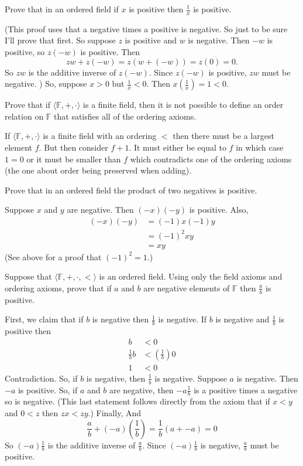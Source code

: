 \documentclass[answers]{exam}
\begin{document}
\begin{questions}
  \question Prove that in an ordered field if $x$ is positive then $\frac{1}{x}$ is positive.
  \begin{solution}
    (This proof uses that a negative times a positive is negative.  So just to be sure I'll prove that first. So 
    suppose $z$ is positive and $w$ is negative.  Then $-w$ is positive, so $z(-w)$ is positive.  Then
    \[ zw + z(-w) = z(w+(-w)) = z(0) = 0. \]
    So $zw$ is the additive inverse of $z(-w)$.  Since $z(-w)$ is positive, $zw$ must be negative. )
    So, suppose $x >0$ but $\frac{1}{x} < 0$.  Then $x\left(\frac{1}{x}\right) = 1 < 0$.
  \end{solution}

  \question Prove that if $\langle \mathbb{F},+,\cdot\rangle$ is a finite field, then it is not possible to define an order relation
  on $\mathbb{F}$ that satisfies all of the ordering axioms.
  \begin{solution}
   If $\langle \mathbb{F},+,\cdot\rangle$ is a finite field with an ordering $<$ then there must be a largest element $f$. But
   then consider $f+1$. It must either be equal to $f$ in which case $1 =0$ or it must be smaller than $f$ which contradicts one
   of the ordering axioms (the one about order being preserved when adding).
  \end{solution}

  \question Prove that in an ordered field the product of two negatives is positive.
  \begin{solution}
    Suppose $x$ and $y$ are negative.  Then $(-x)(-y)$ is positive.  Also,
    \begin{align*}
      (-x)(-y) &= (-1)x(-1)y \\
      &= (-1)^2xy\\
      &= xy
    \end{align*}
    (See above for a proof that $(-1)^2 = 1$.)
  \end{solution}


\question Suppose that $\langle \mathbb{F}, +, \cdot, < \rangle$ is an 
ordered field.  Using only the field axioms and ordering axioms, prove that 
if $a$ and $b$ are negative elements of $\mathbb{F}$ then $\frac{a}{b}$ 
is positive.
\begin{solution}
  First, we claim that if $b$ is negative then $\frac{1}{b}$ is negative. If $b$ is
  negative and $\frac{1}{b}$ is positive then
  \begin{align*}
    b &< 0 \\
    \frac{1}{b}b &< \left(\frac{1}{b}\right)0\\
    1 &< 0
  \end{align*}
  Contradiction. So, if $b$ is negative, then $\frac{1}{b}$ is negative. Suppose $a$ is 
  negative.  Then $-a$ is positive. So, if $a$ and $b$ are negative, then
  $-a\frac{1}{b}$ is a positive times a negative so is negative.  (This last statement follows directly from 
  the axiom that if $x < y$ and $0 < z$ then $zx < zy$.) Finally,
  And
  \[
    \frac{a}{b} + (-a)\left(\frac{1}{b}\right) =  \frac{1}{b}(a+-a) = 0
 \]
  So $(-a)\frac{1}{b}$ is the additive inverse of $\frac{a}{b}$. Since $(-a)\frac{1}{b}$
  is negative, $\frac{a}{b}$ must be positive.
\end{solution}


\end{questions}
\end{document}

